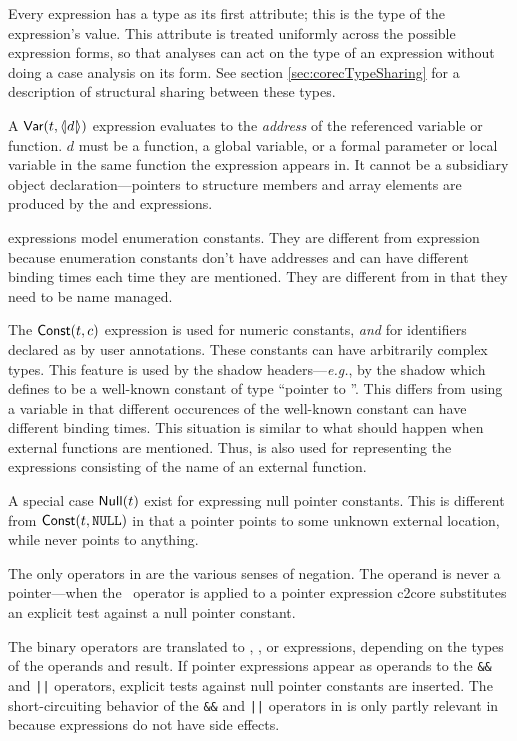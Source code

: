 \begin{docpart}
Every expression has a type as its first attribute; this is the
type of the expression's value. This attribute is treated uniformly
across the possible expression forms, so that analyses can act on
the type of an expression without doing a case analysis on its
form. See section \ref{sec:corecTypeSharing} for a description
of structural sharing between these types.

A $\textsf{Var}(t,\langle\!|d|\!\rangle)$ expression evaluates to the
\emph{address} of the referenced variable or function. $d$ must be
a function, a global variable, or a formal
parameter or local variable in the same function the expression
appears in. It cannot be a subsidiary object declaration---pointers
to structure members and array elements are produced by the
 and  expressions.

 expressions model enumeration constants. They are
different from  expression because enumeration constants
don't have addresses and can have different binding times each
time they are mentioned. They are different from  in that
they need to be name managed.

The $\textsf{Const}(t,c)$ expression is used for numeric constants,
\emph{and} for identifiers declared as
 by user annotations. These constants
can have arbitrarily complex types. This feature is used by the
shadow headers---\emph{e.g.}, by the  shadow which
defines  to be a well-known constant of type ``pointer
to ''. This differs from using a  variable
in that different occurences of the well-known constant can have
different binding times.
This situation is
similar to what should happen when external functions are mentioned.
Thus,  is also used for representing the expressions
consisting of the name of an external function.

A special case $\textsf{Null}(t)$ exist for expressing null pointer
constants. This is different from $\textsf{Const}(t,\texttt{NULL})$
in that a pointer  points to some unknown external
location, while  never points to anything.

The only  operators in \coreC are the various senses
of negation. The operand is never a pointer---when the
\syntax{!}\ operator is applied to a pointer expression c2core
substitutes an explicit test against a null pointer constant.

The binary operators are translated to ,
, or  expressions, depending on the types
of the operands and result. If pointer expressions appear as
operands to the \verb.&&. and \verb.||. operators, explicit
tests against null pointer constants are inserted.
The short-circuiting behavior of the \verb.&&. and \verb.||. operators
in \ansiC is only partly relevant in \coreC because expressions do not
have side effects.


\end{docpart}
